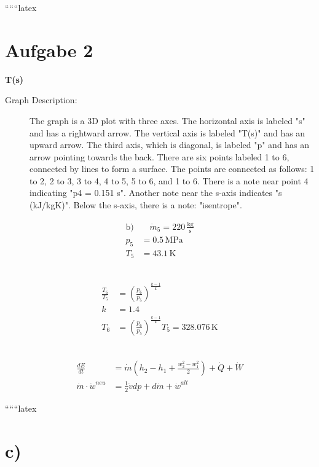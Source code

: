 
``````latex


\section*{Aufgabe 2}
\textbf{T(s)} \\

\begin{description}
    \item[Graph Description:] The graph is a 3D plot with three axes. The horizontal axis is labeled "s" and has a rightward arrow. The vertical axis is labeled "T(s)" and has an upward arrow. The third axis, which is diagonal, is labeled "p" and has an arrow pointing towards the back. There are six points labeled 1 to 6, connected by lines to form a surface. The points are connected as follows: 1 to 2, 2 to 3, 3 to 4, 4 to 5, 5 to 6, and 1 to 6. There is a note near point 4 indicating "p4 = 0.151 s". Another note near the s-axis indicates "s (kJ/kgK)". Below the s-axis, there is a note: "isentrope".
\end{description}

\begin{align*}
    \text{b)} & \quad \dot{m}_5 = 220 \, \frac{\text{kg}}{\text{s}} \\
    p_5 & = 0.5 \, \text{MPa} \\
    T_5 & = 43.1 \, \text{K}
\end{align*}

 \\
\begin{align*}
    \frac{T_6}{T_5} & = \left( \frac{p_6}{p_5} \right)^{\frac{k-1}{k}} \\
    k & = 1.4 \\
    T_6 & = \left( \frac{p_6}{p_5} \right)^{\frac{k-1}{k}} T_5 = 328.076 \, \text{K}
\end{align*}

 \\
\begin{align*}
    \frac{dE}{dt} & = \dot{m} \left( h_2 - h_1 + \frac{w_2^2 - w_1^2}{2} \right) + \dot{Q} + \dot{W} \\
    \dot{m} \cdot \dot{w}^{neu} & = \frac{1}{2} \dot{v} dp + d \dot{m} + \dot{w}^{alt}
\end{align*}

``````latex


\section*{c)}

